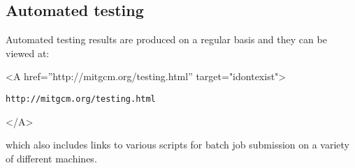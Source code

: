 \subsection{Automated testing}

Automated testing results are produced on a regular basis and they can
be viewed at:
\begin{rawhtml} <A href=''http://mitgcm.org/testing.html'' target="idontexist"> \end{rawhtml}
\begin{verbatim}
http://mitgcm.org/testing.html
\end{verbatim}
\begin{rawhtml} </A> \end{rawhtml}
which also includes links to various scripts for batch job submission
on a variety of different machines.

